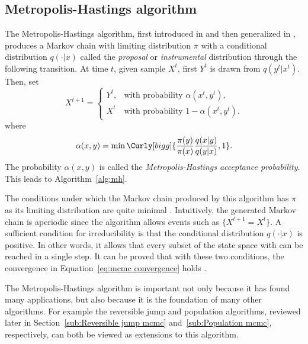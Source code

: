 \subsection{Metropolis-Hastings algorithm}
\label{sub:Metropolis-Hastings algorithm}

The Metropolis-Hastings algorithm, first introduced in
\cite{Metropolis:1953ex} and then generalized in \cite{Hastings:1970gd},
produces a Markov chain with limiting distribution $\pi$ with a conditional
distribution $q(\cdot|x)$ called the \emph{proposal} or \emph{instrumental}
distribution through the following transition. At time $t$, given sample
$X^t$, first $Y^t$ is drawn from $q(y^t|x^t)$. Then, set
\begin{equation*}
  X^{t+1} =
  \begin{cases}
    Y^t, &\text{with probability } \alpha(x^t,y^t),\\
    X^t  &\text{with probability } 1 - \alpha(x^t,y^t).
  \end{cases}
\end{equation*}
where
\begin{equation}
  \alpha(x,y) =
  \min\Curly[bigg]{\frac{\pi(y)}{\pi(x)}\frac{q(x|y)}{q(y|x)},1}.
\end{equation}
The probability $\alpha(x,y)$ is called the \emph{Metropolis-Hastings
  acceptance probability}. This leads to Algorithm~\ref{alg:mh}.



The conditions under which the Markov chain produced by this algorithm has
$\pi$ as its limiting distribution are quite minimal
\cite[][sec.~7.3.2]{Robert:2004tn}. Intuitively, the generated Markov chain
is aperiodic since the algorithm allows events such as $\{X^{t+1} = X^t\}$. A
sufficient condition for irreducibility is that the conditional distribution
$q(\cdot|x)$ is positive. In other words, it allows that every subset of the
state space with can be reached in a single step. It can be proved that with
these two conditions, the convergence in Equation~\eqref{eq:mcmc convergence}
holds \cite[][Theorem~7.4 and Corollary~7.5]{Robert:2004tn}.

The Metropolis-Hastings algorithm is important not only because it has found
many applications, but also because it is the foundation of many other
algorithms. For example the reversible jump \mcmc and population \mcmc
algorithms, reviewed later in Section~\ref{sub:Reversible jump mcmc}
and~\ref{sub:Population mcmc}, respectively, can both be viewed as extensions
to this algorithm.

